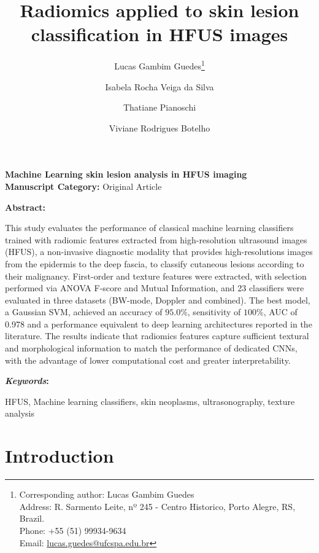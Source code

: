 \documentclass[12pt,a4paper]{article}
\title{\textbf{Radiomics applied to skin lesion classification in HFUS images}}
\author[1]{Lucas Gambim Guedes\thanks{Corresponding author: Lucas Gambim Guedes\\Address: R. Sarmento Leite, nº 245 - Centro Historico, Porto Alegre, RS, Brazil.\\Phone: +55 (51) 99934-9634\\Email: \href{mailto:lucas.guedes@ufcspa.edu.br}{lucas.guedes@ufcspa.edu.br}}}
\author[1]{Isabela Rocha Veiga da Silva}
\author[1]{Thatiane Pianoschi}
\author[1]{Viviane Rodrigues Botelho}
\affil[1]{Federal University of Health Sciences of Porto Alegre, Porto Alegre, RS, Brazil}
\date{}
\newcommand{\keywordsenglishname}{Keywords}
\renewcommand{\abstractname}{Abstract}
\renewenvironment{abstract}{
        \begin{center}
	\begin{minipage}{14cm}
	{\textbf{\abstractname:}}
}{
        \end{minipage}
	\end{center}
}
\newenvironment{keywordsenglish}{
        \def\abstractname{\emph{\keywordsenglishname}}
	\begin{abstract}
}{
        \end{abstract}
}
\begin{document}
\maketitle

\vspace{-1em}
\begin{center}
\textbf{Machine Learning skin lesion analysis in HFUS imaging} \\
\textbf{Manuscript Category:} Original Article
\end{center}
\vspace{0.4cm}

\begin{abstract}

This study evaluates the performance of classical machine learning classifiers trained with radiomic features extracted from high-resolution ultrasound images (HFUS), a non-invasive diagnostic modality that provides high-resolutions images from the epidermis to the deep fascia, to classify cutaneous lesions according to their malignancy. First-order and texture features were extracted, with selection performed via ANOVA F-score and Mutual Information, and 23 classifiers were evaluated in three datasets (BW-mode, Doppler and combined). The best model, a Gaussian SVM, achieved an accuracy of $95.0\%$, sensitivity of $100\%$, AUC of 0.978 and a performance equivalent to deep learning architectures reported in the literature. The results indicate that radiomics features capture sufficient textural and morphological information to match the performance of dedicated CNNs, with the advantage of lower computational cost and greater interpretability. 


\end{abstract}

\begin{keywordsenglish}
HFUS, Machine learning classifiers, skin neoplasms, ultrasonography, texture analysis
\end{keywordsenglish}


\doublespacing

\section{Introduction}
\end{document}
